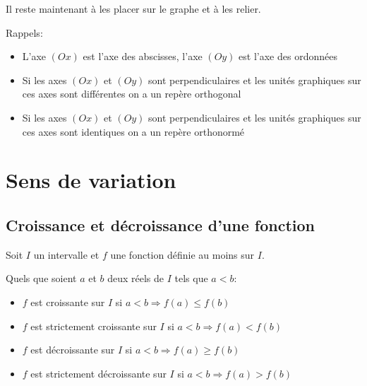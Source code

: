 \documentclass[a4paper,12pt]{scrartcl}
\begin{document}
Il reste maintenant à les placer sur le graphe et à les relier. 

\begin{center}
\end{center}

Rappels: 

\begin{itemize}
\item L'axe $(Ox)$ est l'axe des abscisses, l'axe $(Oy)$ est l'axe des ordonnées
\item Si les axes $(Ox)$ et $(Oy)$ sont perpendiculaires et les unités graphiques sur ces axes sont différentes on a un repère orthogonal
\item Si les axes $(Ox)$ et $(Oy)$ sont perpendiculaires et les unités graphiques sur ces axes sont identiques on a un repère orthonormé
\end{itemize}

\section{Sens de variation}

\subsection{Croissance et décroissance d'une fonction}

Soit $I$ un intervalle et $f$ une fonction définie au moins sur $I$. 

Quels que soient $a$ et $b$ deux réels de $I$ tels que $a<b$:

\begin{itemize}
\item $f$ est croissante sur $I$ si $a<b \Rightarrow f(a) \leq f(b)$
\item $f$ est strictement croissante sur $I$ si $a<b \Rightarrow f(a) < f(b)$
\item $f$ est décroissante sur $I$ si $a<b \Rightarrow f(a) \geq f(b)$
\item $f$ est strictement décroissante sur $I$ si $a<b \Rightarrow f(a) > f(b)$
\end{itemize}
\end{document}
